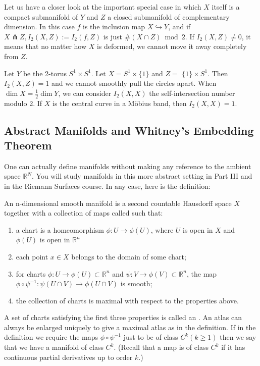 \documentclass[a4paper]{scrartcl}
\begin{document}
Let us have a closer look at the important special case in which $X$ itself is a compact submanifold of $Y$ and $Z$ a closed submanifold of complementary dimension. In this case $f$ is the inclusion map $X \hookrightarrow Y$, and if $X \pitchfork Z, I_{2}(X, Z):=I_{2}(f, Z)$ is just $\#(X \cap Z) \bmod 2$. If $I_{2}(X, Z) \neq 0$, it means that no matter how $X$ is deformed, we cannot move it away completely from $Z$.

\begin{example}
    Let $Y$ be the 2-torus $S^{1} \times S^{1}$. Let $X=S^{1} \times\{1\}$ and $Z=$ $\{1\} \times S^{1}$. Then $I_{2}(X, Z)=1$ and we cannot smoothly pull the circles apart. When $\operatorname{dim} X=\frac{1}{2} \operatorname{dim} Y$, we can consider $I_{2}(X, X)$ the self-intersection number modulo 2. If $X$ is the central curve in a Möbius band, then $I_{2}(X, X)=1$.
\end{example}

\subsection{Abstract Manifolds and Whitney's Embedding Theorem}

One can actually define manifolds without making any reference to the ambient space $\mathbb{R}^{N}$. You will study manifolds in this more abstract setting in Part III and in the Riemann Surfaces course. In any case, here is the definition:

\begin{definition}
    An n-dimensional smooth manifold is a second countable Hausdorff space $X$ together with a collection of maps called  such that:
    \begin{enumerate}
        \item a chart is a homeomorphism $\phi: U \rightarrow \phi(U)$, where $U$ is open in $X$ and $\phi(U)$ is open in $\mathbb{R}^{n}$
        \item each point $x \in X$ belongs to the domain of some chart;
        \item for charts $\phi: U \rightarrow \phi(U) \subset \mathbb{R}^{n}$ and $\psi: V \rightarrow \phi(V) \subset \mathbb{R}^{n}$, the map $\phi \circ \psi^{-1}: \psi(U \cap V) \rightarrow \phi(U \cap V)$ is smooth;
        \item the collection of charts is maximal with respect to the properties above.
    \end{enumerate}
    A set of charts satisfying the first three properties is called an . An atlas can always be enlarged uniquely to give a maximal atlas as in the definition. If in the definition we require the maps $\phi \circ \psi^{-1}$ just to be of class $C^{k}(k \geq 1)$ then we say that we have a manifold of class $C^{k}$. (Recall that a map is of class $C^{k}$ if it has continuous partial derivatives up to order $k$.)
\end{definition}
\end{document}
